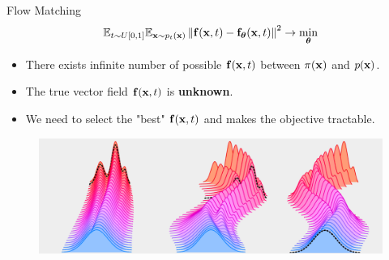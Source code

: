 \begin{frame}{Flow Matching}
	\vspace{-0.3cm}
	\[
		\mathbb{E}_{t \sim U[0, 1]} \mathbb{E}_{\mathbf{x} \sim p_t(\mathbf{x})}\left\| \mathbf{f}(\mathbf{x}, t) - \mathbf{f}_{\boldsymbol{\theta}}(\mathbf{x}, t) \right\|^2 \rightarrow \min_{\boldsymbol{\theta}}
	\]
	\vspace{-0.3cm}
	\begin{itemize}
		\item There exists infinite number of possible $\mathbf{f}(\mathbf{x}, t)$ between $\pi(\mathbf{x})$ and $p(\mathbf{x})$.
		\item The true vector field  $\mathbf{f}(\mathbf{x}, t)$ is \textbf{unknown}.
		\item We need to select the "best" $\mathbf{f}(\mathbf{x}, t)$ and makes the objective tractable.
	\end{itemize}
	\begin{figure}
		\centering
		\includegraphics[width=\linewidth]{figs/multiple_dynamics}
	\end{figure}
\end{frame}
